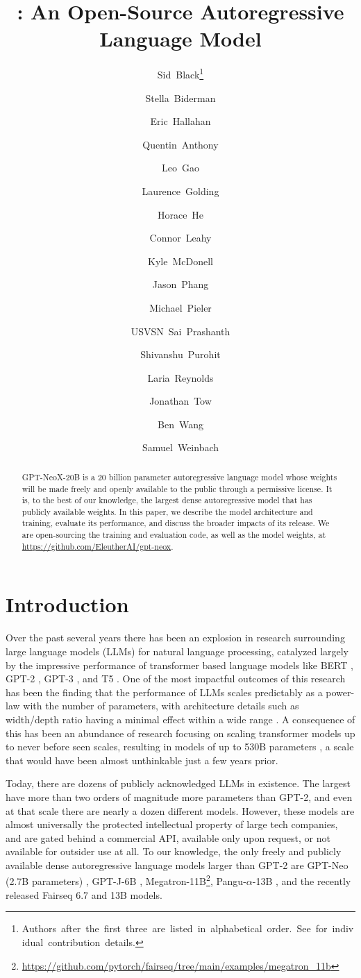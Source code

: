 \documentclass{article}
\title{\model: An Open-Source Autoregressive Language Model}
\author{\mbox{Sid Black\footnote{Authors after the first three are listed in alphabetical order. See \Cref{app:contrib} for individual contribution details.}}}
\author{\mbox{Stella Biderman\protect\footnotemark[1]}}
\author{\mbox{Eric Hallahan\protect\footnotemark[1]}}
\author{\authorcr\mbox{Quentin Anthony}}
\author{\mbox{Leo Gao}}
\author{\mbox{Laurence Golding}}
\author{\mbox{Horace He}}
\author{\mbox{Connor Leahy}}
\author{\mbox{Kyle McDonell}}
\author{\mbox{Jason Phang}}
\author{\mbox{Michael Pieler}}
\author{\mbox{USVSN Sai Prashanth}}
\author{\mbox{Shivanshu Purohit}}
\author{\mbox{Laria Reynolds}}
\author{\mbox{Jonathan Tow}}
\author{\mbox{Ben Wang}}
\author{\mbox{Samuel Weinbach}}
\affil{EleutherAI}
\date{} %
\newcommand{\model}{GPT-NeoX-20B}
\begin{document}
\maketitle

\begin{abstract}

    GPT-NeoX-20B is a 20 billion parameter autoregressive language model whose weights will be made freely and openly available to the public through a permissive license. It is, to the best of our knowledge, the largest dense autoregressive model that has publicly available weights. In this paper, we describe the model architecture and training, evaluate its performance, and discuss the broader impacts of its release. We are open-sourcing the training and evaluation code, as well as the model weights, at \url{https://github.com/EleutherAI/gpt-neox}.
\end{abstract}

\section{Introduction}\label{sec:intro}

Over the past several years there has been an explosion in research surrounding large language models (LLMs) for natural language processing, catalyzed largely by the impressive performance of transformer based language models like BERT \citep{bert}, GPT-2 \citep{radford2019language}, GPT-3 \citep{brown2020language}, and T5 \citep{t5}. One of the most impactful outcomes of this research has been the finding that the performance of LLMs scales predictably as a power-law with the number of parameters, with architecture details such as width/depth ratio having a minimal effect within a wide range \citep{kaplan2020scaling}. A consequence of this has been an abundance of research focusing on scaling transformer models up to never before seen scales, resulting in models of up to 530B parameters \citep{megatron-530b}, a scale that would have been almost unthinkable just a few years prior.

Today, there are dozens of publicly acknowledged LLMs in existence. The largest have more than two orders of magnitude more parameters than GPT-2, and even at that scale there are nearly a dozen different models. However, these models are almost universally the protected intellectual property of large tech companies, and are gated behind a commercial API, available only upon request, or not available for outsider use at all. To our knowledge, the only freely and publicly available dense autoregressive language models larger than GPT-2 are GPT-Neo (2.7B parameters) \citep{black2021gpt}, GPT-J-6B \citep{gpt-j}, Megatron-11B\footnote{\url{https://github.com/pytorch/fairseq/tree/main/examples/megatron_11b}}, Pangu-$\alpha$-13B \citep{pangu}, and the recently released Fairseq 6.7 and 13B \citep{fairseq-13B} models.
\end{document}
